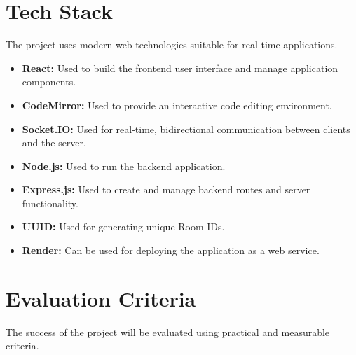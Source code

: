 \documentclass[11pt,letterpaper]{article}
\begin{document}

\section{Tech Stack}

The project uses modern web technologies suitable for real-time applications.

\begin{itemize}
    \item \textbf{React:} Used to build the frontend user interface and manage application components.
    
    \item \textbf{CodeMirror:} Used to provide an interactive code editing environment.
    
    \item \textbf{Socket.IO:} Used for real-time, bidirectional communication between clients and the server.
    
    \item \textbf{Node.js:} Used to run the backend application.
    
    \item \textbf{Express.js:} Used to create and manage backend routes and server functionality.
    
    \item \textbf{UUID:} Used for generating unique Room IDs.
    
    \item \textbf{Render:} Can be used for deploying the application as a web service.
\end{itemize}



\newpage

\section{Evaluation Criteria}

The success of the project will be evaluated using practical and measurable criteria.
\end{document}
